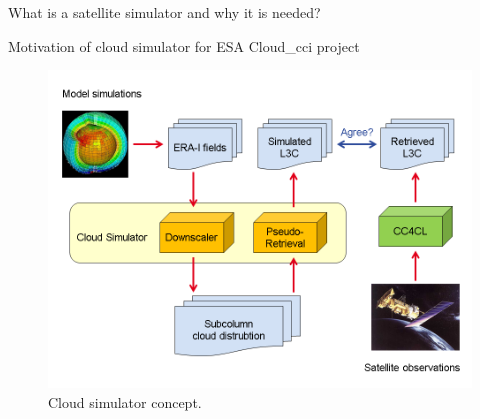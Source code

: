 
 
What is a satellite simulator and why it is needed?

Motivation of cloud simulator for ESA Cloud\_cci project

\begin{figure}[!htp]
 \includegraphics[width=\mapwidth]{./figures/simulator_overview.png}
  \caption[Concept of the cloud simulator.]
{Cloud simulator concept.}\label{fig:sim_over}
\end{figure}
